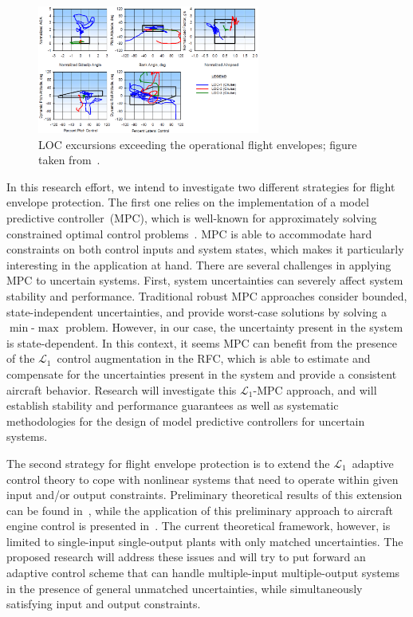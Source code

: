 \documentclass[letter,onecolumn,12pt]{aiaa-tc}
\newcommand{\Lone}{\mathcal{L}_1}
\begin{document}
\begin{figure}[ht]
\centering
\includegraphics[width=0.65\textwidth,]{LOCenvelopes.eps}
\caption{\footnotesize LOC excursions exceeding the operational flight envelopes; figure taken from~\cite{LOC04_LOCMetrics}.}
\label{fig:LOCenvelopes}
\vspace{2mm}
\end{figure}


In this research effort, we intend to investigate two different strategies for flight envelope protection. The first one relies on the implementation of a model predictive controller~(MPC), which is well-known for approximately solving constrained optimal control problems~\cite{aut00_MPC}. MPC is able to accommodate hard constraints on both control inputs and system states, which makes it particularly interesting in the application at hand. There are several challenges in applying MPC to uncertain systems. First, system uncertainties can severely affect system stability and performance. Traditional robust MPC approaches consider bounded, state-independent uncertainties, and provide worst-case solutions by solving a ${\min}$-${\max}$ problem. However, in our case, the uncertainty present in the system is state-dependent. In this context, it seems MPC can benefit from the presence of the $\Lone$~control augmentation in the RFC, which is able to estimate and compensate for the uncertainties present in the system and provide a consistent aircraft behavior. Research will investigate this $\Lone$-MPC approach, and will establish stability and performance guarantees as well as systematic methodologies for the design of model predictive controllers for uncertain systems.


The second strategy for flight envelope protection is to extend the $\Lone$~adaptive control theory to cope with nonlinear systems that need to operate within given input and/or output constraints. Preliminary theoretical results of this extension can be found in~\cite{Infotech11_L1constraints}, while the application of this preliminary approach to aircraft engine control is presented in~\cite{Infotech11_L1engine}. The current theoretical framework, however, is limited to single-input single-output plants with only matched uncertainties. The proposed research will address these issues and will try to put forward an adaptive control scheme that can handle multiple-input multiple-output systems in the presence of general unmatched uncertainties, while simultaneously satisfying input and output constraints.
\end{document}
